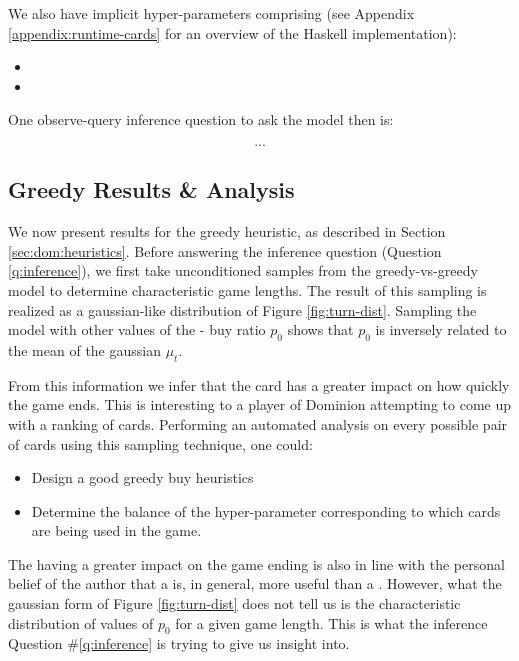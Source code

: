 We also have implicit hyper-parameters comprising (see Appendix
\ref{appendix:runtime-cards} for an overview of the Haskell
implementation):

\begin{itemize}
\item {}
\item {}
\end{itemize}



One observe-query inference question to ask the model then is:

\begin{equation} \label{q:inference}
...
\end{equation}

\subsection{Greedy Results \& Analysis} \label{sec:dom:greedy-results}
We now present results for the greedy heuristic, as described in
Section \ref{sec:dom:heuristics}. Before answering the inference
question (Question \ref{q:inference}), we first take unconditioned
samples from the greedy-vs-greedy model to determine characteristic
game lengths. The result of this sampling is realized as a
gaussian-like distribution of Figure \ref{fig:turn-dist}. Sampling
the model with other values of the  - 
buy ratio $p_0$ shows that $p_0$ is inversely related to the mean
of the gaussian $\mu_{t}$.

From this information we infer that the  card has
a greater impact on how quickly the game ends. This is interesting
to a player of Dominion attempting to come up with a ranking of
cards. Performing an automated analysis on every possible pair
of cards using this sampling technique, one could:

\begin{itemize}
\item Design a good greedy buy heuristics
\item Determine the balance of the hyper-parameter corresponding
      to which cards are being used in the game.
\end{itemize}

The  having a greater impact on the game ending is
also in line with the personal belief of the author that a
 is, in general, more useful than a .
However, what the gaussian form of Figure \ref{fig:turn-dist}
does not tell us is the characteristic distribution of values of
$p_0$ for a given game length. This is what the inference Question
\#\ref{q:inference} is trying to give us insight into.

